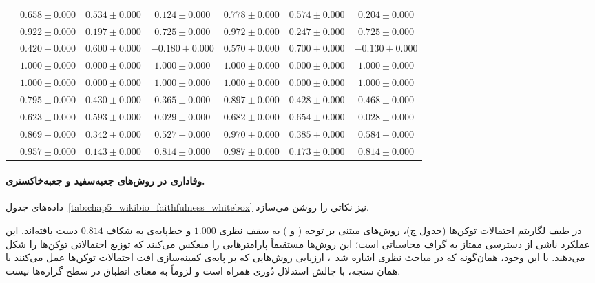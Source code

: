 \begin{table}[!ht]
\begin{tabular}{l !{\color{black}\vline} ccc !{\color{black}\vline} ccc}
        \midrule
         \textbf{} & $0.658 \pm 0.000$ & $0.534 \pm 0.000$ & $0.124 \pm 0.000$ & $0.778 \pm 0.000$ & $0.574 \pm 0.000$ & $0.204 \pm 0.000$ \\
          & $0.922 \pm 0.000$ & $0.197 \pm 0.000$ & $0.725 \pm 0.000$ & $0.972 \pm 0.000$ & $0.247 \pm 0.000$ & $0.725 \pm 0.000$ \\
          & $0.420 \pm 0.000$ & $0.600 \pm 0.000$ & $-0.180 \pm 0.000$ & $0.570 \pm 0.000$ & $0.700 \pm 0.000$ & $-0.130 \pm 0.000$ \\
        \midrule
         & $\mathbf{1.000} \pm 0.000$ & $\mathbf{0.000} \pm 0.000$ & $\mathbf{1.000} \pm 0.000$ & $\mathbf{1.000} \pm 0.000$ & $\mathbf{0.000} \pm 0.000$ & $\mathbf{1.000} \pm 0.000$ \\
         & $\mathbf{1.000} \pm 0.000$ & $\mathbf{0.000} \pm 0.000$ & $\mathbf{1.000} \pm 0.000$ & $\mathbf{1.000} \pm 0.000$ & $\mathbf{0.000} \pm 0.000$ & $\mathbf{1.000} \pm 0.000$ \\
         & $0.795 \pm 0.000$ & $0.430 \pm 0.000$ & $0.365 \pm 0.000$ & $0.897 \pm 0.000$ & $0.428 \pm 0.000$ & $0.468 \pm 0.000$ \\
         & $0.623 \pm 0.000$ & $0.593 \pm 0.000$ & $0.029 \pm 0.000$ & $0.682 \pm 0.000$ & $0.654 \pm 0.000$ & $0.028 \pm 0.000$ \\
         & $0.869 \pm 0.000$ & $0.342 \pm 0.000$ & $0.527 \pm 0.000$ & $0.970 \pm 0.000$ & $0.385 \pm 0.000$ & $0.584 \pm 0.000$ \\
         & $\mathbf{0.957} \pm 0.000$ & $\mathbf{0.143} \pm 0.000$ & $\mathbf{0.814} \pm 0.000$ & $\mathbf{0.987} \pm 0.000$ & $\mathbf{0.173} \pm 0.000$ & $\mathbf{0.814} \pm 0.000$ \\
        \bottomrule
    \end{tabular}
\end{table}

\paragraph{وفاداری در روش‌های جعبه‌سفید و جعبه‌خاکستری.}
داده‌های جدول~\ref{tab:chap5_wikibio_faithfulness_whitebox} نیز نکاتی را روشن می‌سازد.

در طیف لگاریتم احتمالات توکن‌ها (جدول ج)، روش‌های مبتنی بر توجه ( و ) به سقف نظری $1.000$ و خط‌پایه‌ی  به شکاف $0.814$ دست یافته‌اند. این عملکرد ناشی از دسترسی ممتاز به گراف محاسباتی است؛ این روش‌ها مستقیماً پارامترهایی را منعکس می‌کنند که توزیع احتمالاتی توکن‌ها را شکل می‌دهند. با این وجود، همان‌گونه که در مباحث نظری اشاره شد~\cite{ju2022logictraps}، ارزیابی روش‌هایی که بر پایه‌ی کمینه‌سازی افت احتمالات توکن‌ها عمل می‌کنند با همان سنجه، با چالش استدلال دُوری همراه است و لزوماً به معنای انطباق در سطح گزاره‌ها نیست.

